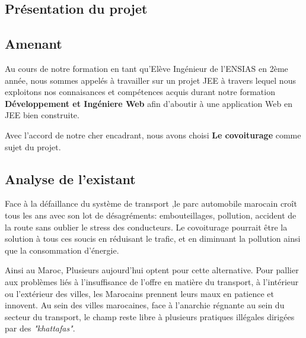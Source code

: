\documentclass[a4paper]{report}
\begin{document}
\tableofcontents
\thispagestyle{empty}
\setcounter{page}{0}

\newpage

\renewcommand{\arraystretch}{1}





\begin{spacing}{2}
\chapter{Présentation du projet}

\section{Amenant}

\par 
Au cours de notre formation en tant qu'Elève Ingénieur de l'ENSIAS en 2ème année, nous sommes appelés à travailler sur un projet JEE à travers lequel nous exploitons nos connaisances et compétences acquis durant notre formation \textbf{Développement et Ingéniere Web} afin d'aboutir à une application Web en JEE bien construite. 

Avec l'accord de notre cher encadrant, nous avons choisi \textbf{Le covoiturage} comme sujet du projet. 

\section{Analyse de l'existant}

\par 
Face à la défaillance du système de transport ,le parc automobile marocain croît tous les ans avec son lot de désagréments: embouteillages, pollution, accident de la route sans oublier le stress des conducteurs. Le covoiturage pourrait être la solution à tous ces soucis en réduisant le trafic, et en diminuant la pollution ainsi que la consommation d’énergie.

Ainsi au Maroc, Plusieurs aujourd'hui optent pour cette alternative. Pour pallier aux problèmes liés à l’insuffisance de l’offre en matière du transport, à l’intérieur ou l’extérieur des villes, les Marocains prennent leurs maux en patience et innovent. Au sein des villes marocaines, face à l’anarchie régnante au sein du secteur du transport, le champ reste libre à plusieurs pratiques illégales dirigées par des \textit{"khattafas"}.


\end{spacing}
\end{document}
